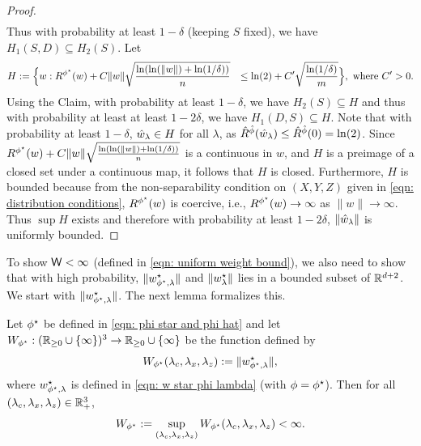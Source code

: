 \begin{proof}
\begin{equation*}
\begin{aligned}
\end{aligned}
\end{equation*}
Thus with probability at least $1-\delta$ (keeping $S$ fixed), we have
$H_1(S,D) \subseteq H_2(S).$
Let
\begin{equation*}
\begin{aligned}
    H &:= \Big\{w: R^{\phi^\star}(w) + C\|w\|\sqrt{\frac{\ln(\ln(\|w\|) + \ln(1/\delta))}{n}}
    &\leq \ln(2) + C'\sqrt{\frac{\ln(1/\delta)}{m}}\Big\}, \text{ where } C' > 0.
    \end{aligned}
\end{equation*}
Using the Claim, with probability at least $1-\delta$, we have $H_2(S) \subseteq H$ and thus with probability at least at least $1-2\delta$, we have $H_1(D,S) \subseteq H$.
Note that with probability at least $1-\delta$, $\hat{w}_\lambda \in H$ for all $\lambda$, as $\hat{R}^{\hat{\phi}}(\hat{w}_\lambda) \leq \hat{R}^{\hat{\phi}}(0) =\ln(2)$. Since $R^{\phi^\star}(w) + C\|w\|\sqrt{\frac{\ln(\ln(\|w\|) + \ln(1/\delta))}{n}}$ is a continuous in $w$, and $H$ is a preimage of a closed set under a continuous map, it follows that $H$ is closed. Furthermore,
$H$ is bounded because from the non-separability condition on $(X,Y,Z)$ given in \eqref{eqn: distribution conditions}, $R^{\phi^\star}(w)$ is coercive, i.e., $R^{\phi^\star}(w) \to \infty$ as $\|w\| \to \infty$. Thus
$\sup H$ exists and therefore with probability at least $1-2\delta$, $\|\hat{w}_\lambda\|$ is uniformly bounded.
\end{proof}

To show $\mathsf{W} < \infty$ (defined in \eqref{eqn: uniform weight bound}), we also need to show that with high probability, $\|w^\star_{\phi^{\star},\lambda}\|$ and $\|w^\star_{\lambda}\|$ lies in a bounded subset of $\mathbb{R}^{d+2}$. We start with $\|w^\star_{\phi^{\star},\lambda}\|$. The next lemma formalizes this.

\begin{lem}\label{lem: wspsl bounding}
    Let $\phi^\star$ be defined in \eqref{eqn: phi star and phi hat} and let $W_{\phi^\star}: (\mathbb{R}_{\geq 0} \cup \{\infty\})^3 \rightarrow \mathbb{R}_{\geq 0} \cup \{\infty\}$ be the function defined by
    \begin{equation}
        W_{\phi^\star}(\lambda_c,\lambda_x,\lambda_z) := \|w^\star_{\phi^\star,\lambda}\|,
    \end{equation}
    where $w^\star_{\phi^\star,\lambda}$ is defined in \eqref{eqn: w star phi lambda} (with $\phi = \phi^\star$).
    Then for all $(\lambda_c,\lambda_x,\lambda_z) \in \mathbb{R}^3_+$, 
      \begin{equation*}
        W_{\phi^\star} := \sup_{(\lambda_c,\lambda_x,\lambda_z)}         W_{\phi^\star}(\lambda_c,\lambda_x,\lambda_z) < \infty.
    \end{equation*}

\end{lem}

